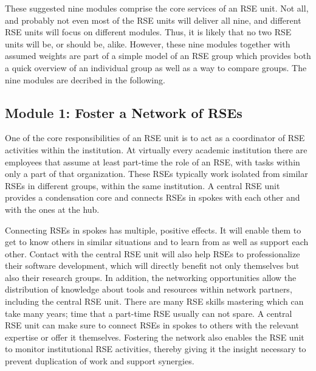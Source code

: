 \documentclass[a4paper]{article}
\begin{document}
These suggested nine modules comprise the core services of an RSE unit.
Not all, and probably not even most of the RSE units will deliver all nine, and different RSE units will focus on different modules.
Thus, it is likely that no two RSE units will be, or should be, alike.
However, these nine modules together with assumed weights are part of a simple model of an RSE group which provides both a quick overview of an individual group as well as a way to compare groups.
The nine modules are decribed in the following.

\subsection{Module 1: Foster a Network of RSEs}%
\label{sec:network}

One of the core responsibilities of an RSE unit is to act as a coordinator of RSE activities within the institution.
At virtually every academic institution there are employees that assume at least part-time the role of an RSE, with tasks within only a part of that organization.
These RSEs typically work isolated from similar RSEs in different groups, within the same institution.
A central RSE unit provides a condensation core and connects RSEs in spokes with each other and with the ones at the hub.

Connecting RSEs in spokes has multiple, positive effects.
It will enable them to get to know others in similar situations and to learn from as well as support each other.
Contact with the central RSE unit will also help RSEs to professionalize their software development, which will directly benefit not only themselves but also their research groups.
In addition, the networking opportunities allow the distribution of knowledge about tools and resources within network partners, including the central RSE unit.
There are many RSE skills mastering which can take many years; time that a part-time RSE usually can not spare.
A central RSE unit can make sure to connect RSEs in spokes to others with the relevant expertise or offer it themselves.
Fostering the network also enables the RSE unit to monitor institutional RSE activities, thereby giving it the insight necessary to prevent duplication of work and support synergies.
\end{document}

